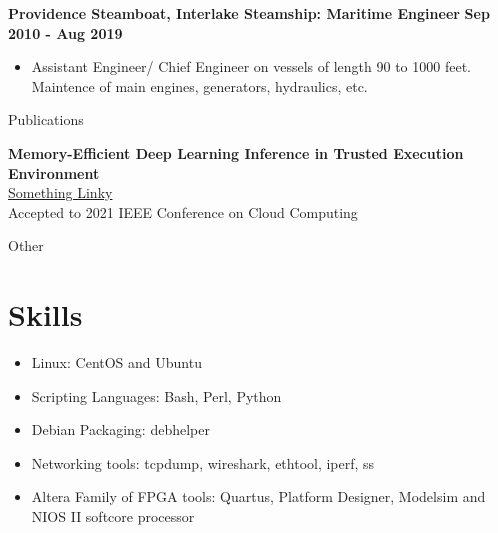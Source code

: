 \documentclass[10pt,a4paper]{article}
\begin{document}
{\begin{tcolorbox}
  \large{\textbf{Providence Steamboat, Interlake Steamship: Maritime Engineer}}
  \hfill
  \large{\textbf{Sep 2010 - Aug 2019}}
  \begin{itemize}[noitemsep]
    \item Assistant Engineer/ Chief Engineer on vessels of length 90 to 1000 feet. Maintence of main engines, generators, hydraulics, etc.
  \end{itemize}

\end{tcolorbox}

\begin{tcolorbox}

  {\selectfont
    \begin{center}
      \LARGE{Publications}
    \end{center}
  }

  \tcblower

  \textbf{Memory-Efficient Deep Learning Inference in Trusted Execution Environment} \\
  \href{http://arxiv-export-lb.library.cornell.edu/abs/2104.15109?context=cs.LG}{Something Linky} \\
  Accepted to 2021 IEEE Conference on Cloud Computing \\
\end{tcolorbox}


\begin{tcolorbox}

  {\selectfont
    \begin{center}
      \LARGE{Other}
    \end{center}
  }

  \tcblower

  \section*{Skills}
  \begin{itemize}[noitemsep]
    \item{Linux: CentOS and Ubuntu}
    \item{Scripting Languages: Bash, Perl, Python}
    \item{Debian Packaging: debhelper}
    \item{Networking tools: tcpdump, wireshark, ethtool, iperf, ss}
    \item{Altera Family of FPGA tools: Quartus, Platform Designer, Modelsim and NIOS II softcore processor}
  \end{itemize}

\end{tcolorbox}

}
\end{document}
